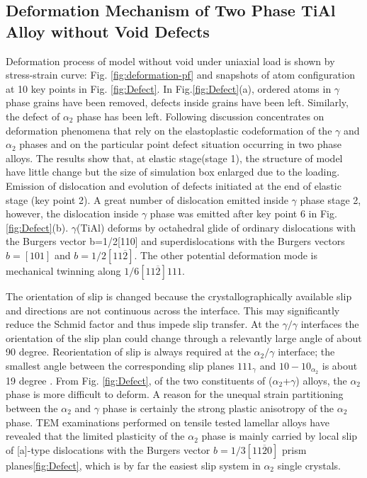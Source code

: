 \documentclass[materials,article,submit,moreauthors,pdftex,10pt,a4paper]{Definitions/mdpi}
\begin{document}
\subsection{Deformation Mechanism of Two Phase TiAl Alloy without Void Defects}
Deformation process of model without void under uniaxial load is shown by stress-strain curve: Fig. \ref{fig:deformation-pf} and snapshots of atom configuration at 10 key points in Fig. \ref{fig:Defect}. In Fig.\ref{fig:Defect}(a), ordered atoms in $\gamma$ phase grains have been removed, defects inside grains have been left. Similarly, the defect of $\alpha_2$ phase has been left. Following discussion concentrates on deformation phenomena that rely on the elastoplastic codeformation of the $\gamma$ and $\alpha_2$ phases and on the particular point defect situation occurring in two phase alloys.  The results show that, at elastic stage(stage 1), the structure of model have little change but the size of simulation box enlarged due to the loading. 
Emission of dislocation and evolution of defects initiated at the end of elastic stage (key point 2). A  great number of dislocation emitted inside $\gamma$ phase stage 2, however,  the dislocation inside $\gamma$ phase was emitted after key point 6 in Fig. \ref{fig:Defect}(b). $\gamma$(TiAl) deforms by octahedral glide of ordinary dislocations with the Burgers vector b=1/2[110] and superdislocations with the Burgers vectors $b=[101]$ and $b=1/2[11\overline{2}]$. The other potential deformation mode is mechanical twinning along $1/6[11\overline{2}]{111}$.

The orientation of slip is changed because the crystallographically available slip and directions are not continuous across the interface. This may significantly reduce the Schmid factor and thus impede slip transfer. At the $\gamma/\gamma$ interfaces the orientation of the slip plan could change through a relevantly large angle of about 90 degree. Reorientation of slip is always required at the $\alpha_{2}/\gamma$ interface; the smallest angle between the corresponding slip planes ${1 1 1}_{\gamma}$ and ${ 1 0 -1 0}_{\alpha_2}$ is about 19 degree \cite{}. From Fig. \ref{fig:Defect}, of the two constituents of ($\alpha_2$+$\gamma$) alloys, the $\alpha_2$ phase is more difficult to deform. A reason for the unequal strain partitioning between the $\alpha_2$ and $\gamma$ phase is certainly the strong plastic anisotropy of the $\alpha_2$ phase. TEM examinations performed on tensile tested lamellar alloys have revealed that the limited plasticity of the $\alpha_2$ phase is mainly carried by local slip of [a]-type dislocations with the Burgers vector $b=1/3[11\overline{2}0]$ prism planes\ref{fig:Defect}, which is by far the easiest slip system in $\alpha_2$ single crystals. 
 
\end{document}
